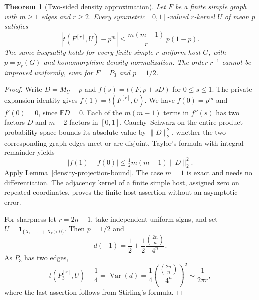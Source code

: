 \documentclass[a4paper,11pt,reqno]{amsart}
\theoremstyle{plain}
\newtheorem{theorem}{Theorem}[section]
\theoremstyle{definition}
\theoremstyle{remark}
\begin{document}
\begin{theorem}[Two-sided density approximation]
\label{density-uniform-approximation}
Let $F$ be a finite simple graph with $m\ge1$ edges and $r\ge2$.
Every symmetric $[0,1]$-valued $r$-kernel $U$ of mean $p$ satisfies
\begin{equation}\label{density-density-error}
 \left|t(F^{[r]},U)-p^m\right|
    \le\frac{m(m-1)}r\,p(1-p).
\end{equation}
The same inequality holds for every finite simple $r$-uniform host
$G$, with $p=p_r(G)$ and homomorphism-density normalization.
The order $r^{-1}$ cannot be improved uniformly, even for $F=P_3$
and $p=1/2$.
\end{theorem}
\begin{proof}
Write $D=M_U-p$ and $f(s)=t(F,p+sD)$ for $0\le s\le1$.
The private-expansion identity gives $f(1)=t(F^{[r]},U)$.
We have $f(0)=p^m$ and $f'(0)=0$, since $\mathbb ED=0$.
Each of the $m(m-1)$ terms in $f''(s)$ has two factors $D$
and $m-2$ factors in $[0,1]$.  Cauchy--Schwarz on the entire
product probability space bounds its absolute value by
$\|D\|_2^2$, whether the two corresponding graph edges meet or
are disjoint.  Taylor's formula with integral remainder yields
\[
 |f(1)-f(0)|\le\tfrac12m(m-1)\|D\|_2^2.
\]
Apply Lemma~\ref{density-projection-bound}.  The case $m=1$
is exact and needs no differentiation.  The adjacency kernel of a
finite simple host, assigned zero on repeated coordinates, proves
the finite-host assertion without an asymptotic error.

For sharpness let $r=2n+1$, take independent uniform signs, and set
$U=\mathbf1_{\{X_1+\cdots+X_r>0\}}$.  Then $p=1/2$ and
\[
 d(\pm1)=\frac12\pm\frac12\frac{\binom{2n}{n}}{4^n}.
\]
As $P_3$ has two edges,
\[
 t(P_3^{[r]},U)-\frac14
  =\operatorname{Var}(d)
  =\frac14\left(\frac{\binom{2n}{n}}{4^n}\right)^2
  \sim\frac{1}{2\pi r},
\]
where the last assertion follows from Stirling's formula.
\end{proof}
\end{document}
